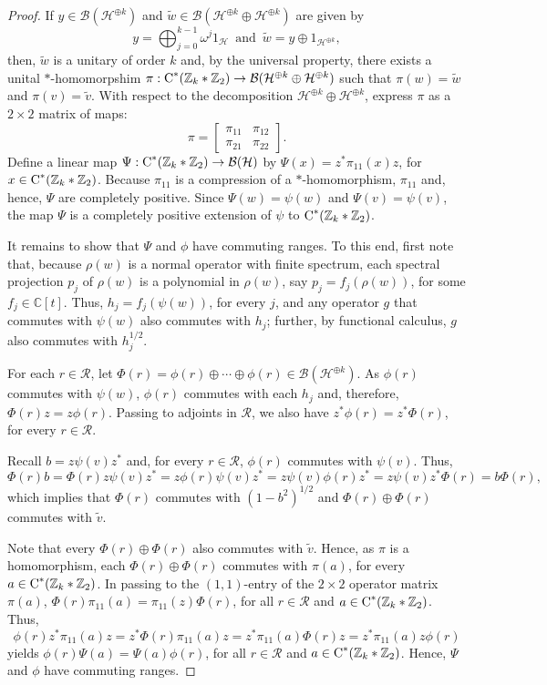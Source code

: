 \documentclass{amsart}
\theoremstyle{definition}
\theoremstyle{remark}
\newcommand{\B}{\mathcal{B}}
\renewcommand{\H}{\mathcal{H}}
\newcommand\osr{{\mathcal R}}
\newcommand\cstar{{\textrm C}^*}                              %
\numberwithin{equation}{section}
\begin{document}
\begin{proof}
If $y\in \B(\H^{\oplus k} )$ and $\tilde w\in \B(\H^{\oplus k}\oplus\H^{\oplus k})$ are given by
\[
y=\bigoplus_{j=0}^{k-1}\omega^j 1_\H
\,\mbox{ and }\,
\tilde w = y\oplus 1_{\H^{\oplus k}},
\]
then, $\tilde w$ is a unitary of order $k$ and, by the universal property, there exists 
a unital $*$-homomorpshim
$\pi:\cstar(\mathbb Z_k * \mathbb Z_2)\rightarrow\B(\H^{\oplus k}\oplus\H^{\oplus k})$
such that $\pi(w)=\tilde w$ and $\pi(v)=\tilde v$.
With respect to the decomposition $\H^{\oplus k}\oplus\H^{\oplus k}$, express $\pi$ as a 
$2\times2$ matrix of maps:
\[
\pi=\begin{bmatrix}
		\pi_{11}&\pi_{12}\\\pi_{21}&\pi_{22}
	\end{bmatrix}.
\]
Define a linear map $\Psi:\cstar(\mathbb Z_k * \mathbb Z_2)\rightarrow\B(\H)$ by $\Psi(x)=z^*\pi_{11}(x)z$, for $x\in \cstar(\mathbb Z_k * \mathbb Z_2)$.
Because $\pi_{11}$ is a compression of a $*$-homomorphism, $\pi_{11}$ and, hence, $\Psi$ are completely positive. Since $\Psi(w)=\psi(w)$
and $\Psi(v)=\psi(v)$, the map $\Psi$ is a completely positive extension of $\psi$ to $\cstar(\mathbb Z_k * \mathbb Z_2)$.

It remains to show that $\Psi$ and $\phi$ have commuting ranges. To this end, 
first note that, because $\rho(w)$ is a normal operator with finite spectrum, each spectral projection $p_j$ of $\rho(w)$ is a polynomial in $\rho(w)$,
say $p_j=f_j(\rho(w))$, for some $f_j\in\mathbb C[t]$. Thus, $h_j=f_j(\psi(w))$, for every $j$, and any operator $g$ that commutes 
with $\psi(w)$ also commutes with $h_j$; further, by functional calculus, $g$ also commutes with $h_j^{1/2}$.

For each $r\in\mathcal R$, let $\Phi(r)=\phi(r)\oplus\cdots\oplus\phi(r)\in \B(\H^{\oplus k})$. As $\phi(r)$ commutes with $\psi(w)$, $\phi(r)$ commutes
with each $h_j$ and, therefore, $\Phi(r)z=z\phi(r)$. Passing to adjoints in $\osr$, we also have $z^*\phi(r)=z^*\Phi(r)$, for every $r\in\osr$.

Recall $b=z\psi(v)z^*$ and, for every $r\in\osr$, $\phi(r)$ commutes with $\psi(v)$. Thus, 
\[
\Phi(r)b=\Phi(r)z\psi(v)z^*=z\phi(r)\psi(v)z^*=z\psi(v)\phi(r)z^*=z\psi(v)z^*\Phi(r)=b\Phi(r),
\]
which implies that $\Phi(r)$ commutes with $(1-b^2)^{1/2}$ and $\Phi(r)\oplus\Phi(r)$ commutes with $\tilde v$.

Note that every $\Phi(r)\oplus\Phi(r)$ also commutes with $\tilde v$. Hence, as $\pi$ is a homomorphism, each
$\Phi(r)\oplus\Phi(r)$ commutes with $\pi(a)$, for every $a\in\cstar(\mathbb Z_k * \mathbb Z_2)$. In passing to the $(1,1)$-entry of the
$2\times 2$ operator matrix $\pi(a)$, $\Phi(r)\pi_{11}(a)=\pi_{11}(z)\Phi(r)$, for all $r\in\osr$ and $a\in\cstar(\mathbb Z_k * \mathbb Z_2)$.
Thus,
\[
\phi(r)z^*\pi_{11}(a)z=z^*\Phi(r)\pi_{11}(a)z=z^*\pi_{11}(a)\Phi(r)z=z^*\pi_{11}(a)z\phi(r)
\]
yields $\phi(r)\Psi(a)=\Psi(a)\phi(r)$, for all $r\in\osr$ and $a\in\cstar(\mathbb Z_k * \mathbb Z_2)$. Hence,
$\Psi$ and $\phi$ have commuting ranges.
\end{proof}
\end{document}
